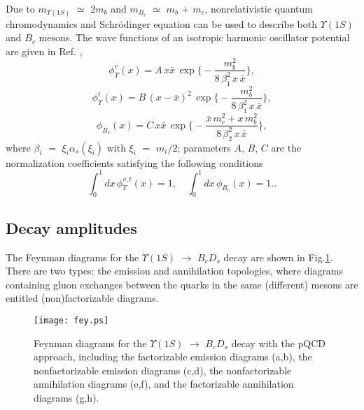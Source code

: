 \documentclass[preprint,superscriptaddress,nofootinbib]{revtex4}
\begin{document}
  Due to $m_{{\Upsilon}(1S)}$ ${\simeq}$ $2m_{b}$
  and $m_{B_{c}}$ ${\simeq}$ $m_{b}$ $+$ $m_{c}$,
  nonrelativistic quantum chromodynamics
  \cite{prd46,prd51,rmp77} and
  Schr\"{o}dinger equation can be used to describe
  both ${\Upsilon}(1S)$ and $B_{c}$ mesons.
  The wave functions of an isotropic harmonic
  oscillator potential are given in Ref. \cite{prd92},
   \begin{equation}
  {\phi}_{\Upsilon}^{v}(x) = A\, x\bar{x}\,
  {\exp}\Big\{ -\frac{m_{b}^{2}}{8\,{\beta}_{1}^{2}\,x\,\bar{x}} \Big\}
   \label{wave-bbv},
   \end{equation}
   \begin{equation}
  {\phi}_{\Upsilon}^{t}(x) = B\, (x-\bar{x})^{2}\,
  {\exp}\Big\{ -\frac{m_{b}^{2}}{8\,{\beta}_{1}^{2}\,x\,\bar{x}} \Big\}
   \label{wave-bbt},
   \end{equation}
   \begin{equation}
  {\phi}_{B_{c}}(x) = C\, x\bar{x}\,
  {\exp}\Big\{ -\frac{\bar{x}\,m_{c}^{2}+x\,m_{b}^{2}}
                     {8\,{\beta}_{2}^{2}\,x\,\bar{x}} \Big\}
   \label{wave-bc},
   \end{equation}
   where ${\beta}_{i}$ $=$ ${\xi}_{i}{\alpha}_{s}({\xi}_{i})$
   with ${\xi}_{i}$ $=$ $m_{i}/2$;
   parameters $A$, $B$, $C$ are the normalization coefficients
   satisfying the following conditions
   \begin{equation}
  {\int}_{0}^{1}dx\,{\phi}_{\Upsilon}^{v,t}(x) =1,
   \quad
  {\int}_{0}^{1}dx\,{\phi}_{B_{c}}(x)=1.
   \label{wave-abc}.
   \end{equation}

  \subsection{Decay amplitudes}
  \label{sec0205}
  The Feynman diagrams for the ${\Upsilon}(1S)$ ${\to}$
  $B_{c}D_{s}$ decay are shown in Fig.\ref{fig1}.
  There are two types: the emission and annihilation
  topologies, where diagrams containing gluon exchanges
  between the quarks in the same (different) mesons
  are entitled (non)factorizable diagrams.
  \begin{figure}[h]
  \texttt{[image: fey.ps]}
  \caption{Feynman diagrams for the ${\Upsilon}(1S)$ ${\to}$
  $B_{c}D_{s}$ decay with the pQCD approach, including
  the factorizable emission diagrams (a,b),
  the nonfactorizable emission diagrams (c,d),
  the nonfactorizable annihilation diagrams (e,f),
  and the factorizable annihilation diagrams (g,h).}
  \label{fig1}
  \end{figure}
\end{document}
